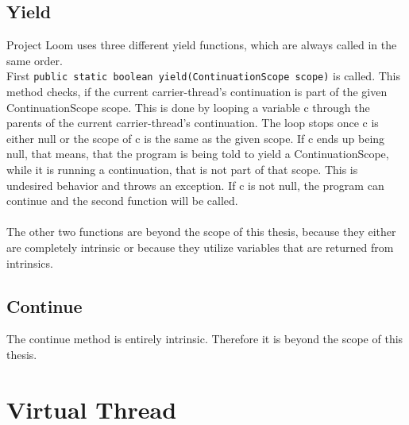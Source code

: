 \subsection{Yield}
Project Loom uses three different yield functions, which are always called in the same order.
\\
First \lstinline[basicstyle=\ttfamily\color{blue}]{public static boolean yield(ContinuationScope scope)} is called. This method checks, if the current carrier-thread's continuation is part of the given ContinuationScope scope. This is done by looping a variable c through the parents of the current carrier-thread's continuation. The loop stops once c is either null or the scope of c is the same as the given scope. If c ends up being null, that means, that the program is being told to yield a ContinuationScope, while it is running a continuation, that is not part of that scope. This is undesired behavior and throws an exception. If c is not null, the program can continue and the second function will be called.
\\
\\
The other two functions are beyond the scope of this thesis, because they either are completely intrinsic or because they utilize variables that are returned from intrinsics.


\subsection{Continue}
The continue method is entirely intrinsic. Therefore it is beyond the scope of this thesis.




\section{Virtual Thread}

